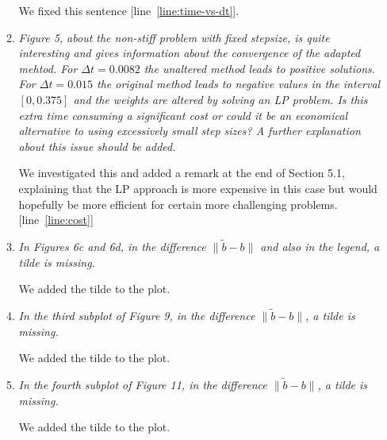 \documentclass[11pt]{letter}
\begin{document}
\begin{letter}{}
\begin{enumerate}[label=\arabic*.]
\begin{enumerate}[label=\alph*)]
    We fixed this sentence [line~\ref{line:time-vs-dt}].


    \item \emph{%
    Figure 5, about the non-stiff problem with fixed stepsize, is quite interesting
    and gives information about the convergence of the adapted mehtod. For
    $\Delta t = 0.0082$ the unaltered method leads to positive solutions. For
    $\Delta t = 0.015$ the original method leads to negative values in the
    interval $[0, 0.375]$ and the weights are altered by solving an LP problem.
    Is this extra time consuming a significant cost or could it be an economical
    alternative to using excessively small step sizes? A further explanation
    about this issue should be added.
    }

    We investigated this and added a remark at the end of Section 5.1, explaining
    that the LP approach is more expensive in this case but would hopefully be
    more efficient for certain more challenging problems.  [line~\ref{line:cost}]


    \item \emph{%
    In Figures 6c and 6d, in the difference $\| \tilde b - b \|$ and also in the
    legend, a tilde is missing.
    }

    We added the tilde to the plot.


    \item \emph{%
    In the third subplot of Figure 9, in the difference $\| \tilde b - b \|$,
    a tilde is missing.
    }

    We added the tilde to the plot.


    \item \emph{%
    In the fourth subplot of Figure 11, in the difference $\| \tilde b - b \|$,
    a tilde is missing.
    }

    We added the tilde to the plot.
  \end{enumerate}
\end{enumerate}








\end{letter}
\end{document}
